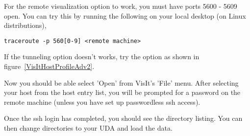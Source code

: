 \documentclass[11pt,fleqn]{book} %
\begin{document}
For the remote visualization option to work, you must have ports 5600
- 5609 open. You can try this by running the following on your local
desktop (on Linux distributions),

\begin{lstlisting}
traceroute -p 560[0-9] <remote machine>
\end{lstlisting}





If the tunneling option doesn't works, try the option as shown in
figure~\ref{VisItHostProfileAdv2}.



Now you should be able select 'Open' from VisIt's 'File' menu. After
selecting your host from the host entry list, you will be prompted for
a password on the remote machine (unless you have set up passwordless
ssh access).

Once the ssh login has completed, you should see the directory
listing. You can then change directories to your UDA and load the
data.



\end{document}
